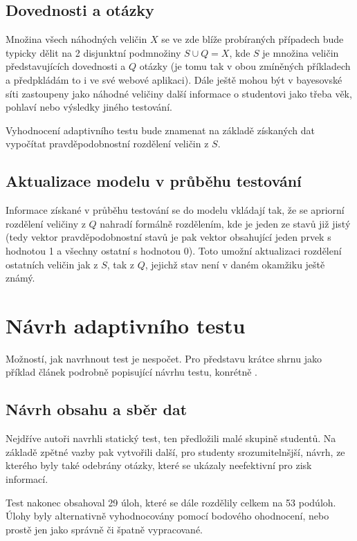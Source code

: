 \documentclass[a4paper,twoside,12pt]{book}
\begin{document}
\section{Dovednosti a otázky}
Množina všech náhodných veličin $X$ se ve zde blíže probíraných případech bude typicky dělit na 2 disjunktní podmnožiny $S \cup Q = X$, kde $S$ je množina veličin představujících dovednosti a $Q$ otázky (je tomu tak v obou zmíněných příkladech a předpkládám to i ve své webové aplikaci). Dále ještě mohou být v bayesovské síti zastoupeny jako náhodné veličiny další informace o studentovi jako třeba věk, pohlaví nebo výsledky jiného testování.

Vyhodnocení adaptivního testu bude znamenat na základě získaných dat vypočítat pravděpodobnostní rozdělení veličin z $S$.

\section{Aktualizace modelu v průběhu testování}
Informace získané v průběhu testování se do modelu vkládají tak, že se apriorní rozdělení veličiny z $Q$ nahradí formálně rozdělením, kde je jeden ze stavů již jistý (tedy vektor pravděpodobnostní stavů je pak vektor obsahující jeden prvek s hodnotou 1 a všechny ostatní s hodnotou 0). Toto umožní aktualizaci rozdělení ostatních veličin jak z $S$, tak z $Q$, jejichž stav není v daném okamžiku ještě známý.



\chapter{Návrh adaptivního testu}
Možností, jak navrhnout test je nespočet. Pro představu krátce shrnu jako příklad článek podrobně popisující návrhu testu, konrétně \cite{vomlel_plajner2015}.

\section{Návrh obsahu a sběr dat}
Nejdříve autoři navrhli statický test, ten předložili malé skupině studentů. Na základě zpětné vazby pak vytvořili další, pro studenty srozumitelnšjší, návrh, ze kterého byly také odebrány otázky, které se ukázaly neefektivní pro zisk informací.

Test nakonec obsahoval 29 úloh, které se dále rozdělily celkem na 53 podúloh. Úlohy byly alternativně vyhodnocovány pomocí bodového ohodnocení, nebo prostě jen jako správně či špatně vypracované.
\end{document}
